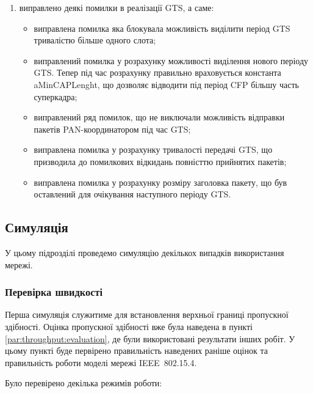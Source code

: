\documentclass[a4paper,ukrainian,utf8,nocolumnsxix,floatsection]{eskdtext}
\renewcommand\paragraph{\subsubsection}
\newcommand{\iee}[0]{IEEE~802.15.4\xspace}
\begin{document}
\begin{enumerate}
	\item виправлено деякі помилки в реалізації GTS, а саме:
	\begin{itemize}
		\item виправлена помилка яка блокувала можливість виділити період GTS тривалістю більше одного слота;
		\item виправлений помилка у розрахунку можливості виділення нового періоду GTS. Тепер під час розрахунку правильно враховується константа aMinCAPLenght, що дозволяє відводити під період CFP більшу часть суперкадра;
		\item виправлений ряд помилок, що не виключали можливість відправки пакетів PAN-координатором під час GTS;
		\item виправлена помилка у розрахунку тривалості передачі GTS, що призводила до помилкових відкидань повністтю прийнятих пакетів;
		\item виправлена помилка у розрахунку розміру заголовка пакету, що був оставлений для очікування наступного періоду GTS.
	\end{itemize}

\end{enumerate}

\subsection{Симуляція}

У цьому підрозділі проведемо симуляцію декількох випадків використання мережі. 

\paragraph{Перевірка швидкості}

Перша симуляція служитиме для встановлення верхньої границі пропускної здібності. Оцінка пропускної здібності вже була наведена в пункті \ref{par:throughput:evaluation}, де були використовані результати інших робіт. У цьому пункті буде первірено правильність наведених раніше оцінок та правильність роботи моделі мережі \iee.

Було перевірено декілька режимів роботи:
\end{document}
